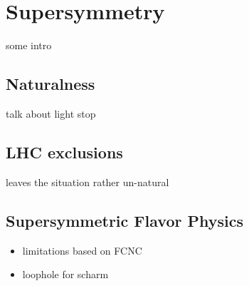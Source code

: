 \section{Supersymmetry}
some intro
\subsection{Naturalness}
talk about light stop
\subsection{LHC exclusions}
leaves the situation rather un-natural
\subsection{Supersymmetric Flavor Physics}
\begin{itemize}
\item limitations based on FCNC
\item loophole for scharm
\end{itemize}
